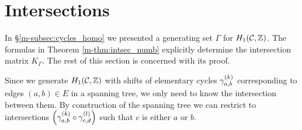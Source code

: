 \documentclass[main.tex]{subfiles}
\begin{document}
  \section{Intersections}\label{sec:intersections}

  In \S \ref{m-subsec:cycles_homo} we presented a generating set $\Gamma$ for $H_1(\mathcal{C},\mathbb{Z})$.
  The formulas in Theorem \ref{m-thm:intsec_numb} explicitly determine the
  intersection matrix $K_{\Gamma}$.
  The rest of this section is concerned with its proof.

  Since we generate $H_1(\mathcal{C},\mathbb{Z})$ with shifts of elementary cycles $\gamma_{a,b}^{(k)}$ corresponding to edges $(a,b) \in E$ in a spanning tree, we only need to know the intersection between them.
  By construction of the spanning tree we can restrict to intersections $\left(\gamma_{a,b}^{(k)} \circ \gamma_{c,d}^{(l)}\right)$ such that $c$ is either $a$ or $b$.
\end{document}
